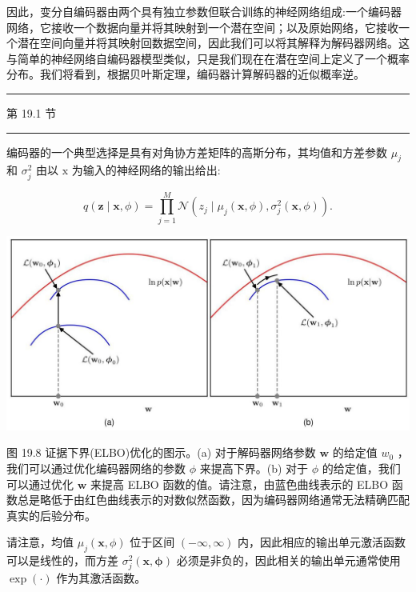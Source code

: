 \documentclass[10pt]{article}
\newcommand{\HRule}{\begin{center}\rule{0.9\linewidth}{0.2mm}\end{center}}
\begin{document}
因此，变分自编码器由两个具有独立参数但联合训练的神经网络组成:一个编码器网络，它接收一个数据向量并将其映射到一个潜在空间；以及原始网络，它接收一个潜在空间向量并将其映射回数据空间，因此我们可以将其解释为解码器网络。这与简单的神经网络自编码器模型类似，只是我们现在在潜在空间上定义了一个概率分布。我们将看到，根据贝叶斯定理，编码器计算解码器的近似概率逆。

\HRule

第 19.1 节

\HRule

编码器的一个典型选择是具有对角协方差矩阵的高斯分布，其均值和方差参数 \({\mu }_{j}\) 和 \({\sigma }_{j}^{2}\) 由以 \(\mathrm{x}\) 为输入的神经网络的输出给出:

\[
q\left( {\mathbf{z} \mid  \mathbf{x},\phi }\right)  = \mathop{\prod }\limits_{{j = 1}}^{M}\mathcal{N}\left( {{z}_{j} \mid  {\mu }_{j}\left( {\mathbf{x},\phi }\right) ,{\sigma }_{j}^{2}\left( {\mathbf{x},\phi }\right) }\right) . \tag{19.13}
\]

\begin{center}
\includegraphics[max width=1.0\textwidth]{images/0194e279-9b28-703a-88f4-c3ac21e2010d_592_239_347_1324_640_0.jpg}
\end{center}
\hspace*{3em} 

图 19.8 证据下界(ELBO)优化的图示。(a) 对于解码器网络参数 \(\mathbf{w}\) 的给定值 \({w}_{0}\) ，我们可以通过优化编码器网络的参数 \(\phi\) 来提高下界。(b) 对于 \(\phi\) 的给定值，我们可以通过优化 \(\mathbf{w}\) 来提高 ELBO 函数的值。请注意，由蓝色曲线表示的 ELBO 函数总是略低于由红色曲线表示的对数似然函数，因为编码器网络通常无法精确匹配真实的后验分布。

请注意，均值 \({\mu }_{j}\left( {\mathbf{x},\phi }\right)\) 位于区间 \(\left( {-\infty ,\infty }\right)\) 内，因此相应的输出单元激活函数可以是线性的，而方差 \({\sigma }_{j}^{2}\left( {\mathbf{x},\mathbf{\phi }}\right)\) 必须是非负的，因此相关的输出单元通常使用 \(\exp \left( \cdot \right)\) 作为其激活函数。
\end{document}
